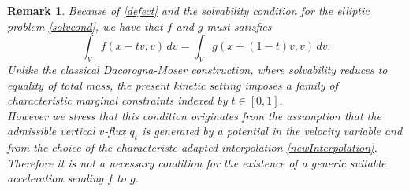 \documentclass[11pt]{article}
\newtheorem{remark}{Remark}[section]
\begin{document}
\begin{remark} 
Because of \eqref{defect} and the solvability condition for the elliptic problem \eqref{solvcond}, we have that $f$ and $g$ must satisfies 
\[
        \int_V f(x-tv,v)\,dv
        =
        \int_V g(x+(1-t)v,v)\,dv .
\]
Unlike the classical Dacorogna-Moser construction, where solvability reduces
to equality of total mass, the present kinetic setting imposes a family of
characteristic marginal constraints indexed by \(t\in[0,1]\).\\
However we stress that this condition originates from the assumption 
that the admissible vertical $v$-flux \(q_t\) is generated 
by a potential in the velocity variable and from the choice of the characteristc-adapted interpolation \eqref{newInterpolation}. Therefore it is not a 
necessary condition for the existence of a generic suitable acceleration sending $f$ to $g$.  
\end{remark}
\medskip




\end{document}
